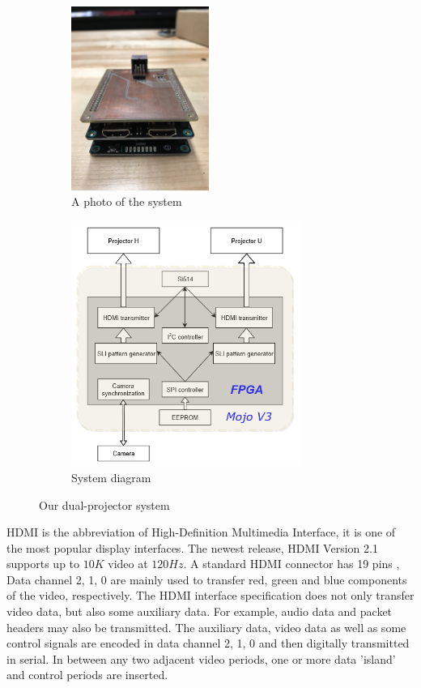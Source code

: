 \documentclass[]{spie}  %
\begin{document}
\begin{figure}
\centering
\begin{subfigure}{.5\textwidth}
  \centering
  \includegraphics[height=6cm, angle=90]{mojo.jpg}
  \caption{A photo of the system}
  \label{fig:sub1}
\end{subfigure}%
\begin{subfigure}{.5\textwidth}
  \centering
   \includegraphics[height=8cm]{sysdgv3.png}
  \caption{System diagram}
  \label{fig:sub2}
\end{subfigure}
\caption{Our dual-projector system}
\label{Fig:2}
\end{figure}

HDMI is the abbreviation of High-Definition Multimedia Interface, it is one of the most popular display interfaces. The newest release, HDMI Version 2.1 supports up to $10K$ video at $120 Hz$. A standard HDMI connector has 19 pins \cite{hdmi14}, Data channel 2, 1, 0 are mainly used to transfer red, green and blue components of the video, respectively. The HDMI interface specification does not only transfer video data, but also some auxiliary data. For example, audio data and packet headers may also be transmitted. The auxiliary data, video data as well as some control signals are encoded in data channel 2, 1, 0 and then digitally transmitted in serial. In between any two adjacent video periods, one or more data 'island' and control periods are inserted. 
\end{document}
